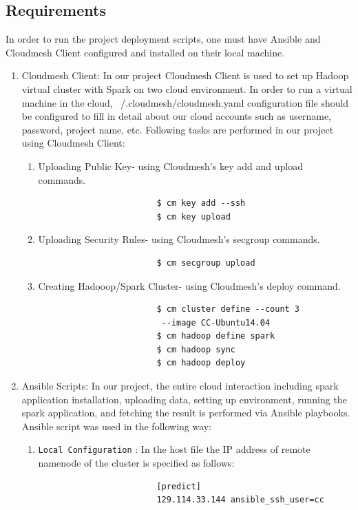 \documentclass[9pt,twocolumn,twoside]{../../styles/osajnl}
\begin{document}
	\subsection{Requirements}
		In order to run the project deployment scripts, one must have Ansible and Cloudmesh Client configured and installed on their local machine. 
	\begin{enumerate}
		\item Cloudmesh Client:		
		In our project Cloudmesh Client is used to set up Hadoop virtual cluster with Spark on two cloud environment. In order to run a virtual machine in the cloud, ~/.cloudmesh/cloudmesh.yaml configuration file should be configured to fill in detail about our cloud accounts such as username, password, project name, etc. Following tasks are performed in our project using Cloudmesh Client:
		
		\begin{enumerate}
			\item {Uploading Public Key-} using Cloudmesh's key add and upload commands.
					\begin{verbatim}
						$ cm key add --ssh
						$ cm key upload
					\end{verbatim}	
					
			\item {Uploading Security Rules-} using Cloudmesh's secgroup commands.  
					\begin{verbatim}
						$ cm secgroup upload
					\end{verbatim}	
			\item {Creating Hadooop/Spark Cluster-} using Cloudmesh's deploy command. 
					\begin{verbatim}
						$ cm cluster define --count 3  
						 --image CC-Ubuntu14.04
						$ cm hadoop define spark
						$ cm hadoop sync
						$ cm hadoop deploy
					\end{verbatim}	
		\end{enumerate}
		
		
		
		
		\item Ansible Scripts:
			In our project, the entire cloud interaction including spark application installation, uploading data, setting up environment, running the spark application, and fetching the result is performed via Ansible playbooks.
			Ansible script was used in the following way:
			
			\begin{enumerate}
				\item \verb|Local Configuration| :
				In the host file the IP address of  remote namenode of the cluster is specified as follows:
					\begin{verbatim}
						[predict]
						129.114.33.144 ansible_ssh_user=cc
					\end{verbatim}


\end{enumerate}
\end{enumerate}
\end{document}
